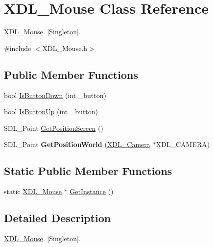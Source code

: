 \hypertarget{class_x_d_l___mouse}{\section{X\-D\-L\-\_\-\-Mouse Class Reference}
\label{class_x_d_l___mouse}
}


\hyperlink{class_x_d_l___mouse}{X\-D\-L\-\_\-\-Mouse}. \mbox{[}Singleton\mbox{]}.  




{\ttfamily \#include $<$X\-D\-L\-\_\-\-Mouse.\-h$>$}

\subsection*{Public Member Functions}
\begin{DoxyCompactItemize}
\item 
bool \hyperlink{class_x_d_l___mouse_ad07734a5e9bb2c0b32b991f9643c860e}{Is\-Button\-Down} (int \-\_\-button)
\item 
bool \hyperlink{class_x_d_l___mouse_af63c498b0d2b215842a7e333e87416e3}{Is\-Button\-Up} (int \-\_\-button)
\item 
S\-D\-L\-\_\-\-Point \hyperlink{class_x_d_l___mouse_a654ae153971ba2010b25a4fa430d1b16}{Get\-Position\-Screen} ()
\item 
\hypertarget{class_x_d_l___mouse_a9e68aafbf47ac4c3a52f09e83f65aa69}{S\-D\-L\-\_\-\-Point {\bfseries Get\-Position\-World} (\hyperlink{class_x_d_l___camera}{X\-D\-L\-\_\-\-Camera} $\ast$X\-D\-L\-\_\-\-C\-A\-M\-E\-R\-A)}\label{class_x_d_l___mouse_a9e68aafbf47ac4c3a52f09e83f65aa69}

\end{DoxyCompactItemize}
\subsection*{Static Public Member Functions}
\begin{DoxyCompactItemize}
\item 
static \hyperlink{class_x_d_l___mouse}{X\-D\-L\-\_\-\-Mouse} $\ast$ \hyperlink{class_x_d_l___mouse_a2074beb3e04a67b2a271f5c15f663a6d}{Get\-Instance} ()
\end{DoxyCompactItemize}


\subsection{Detailed Description}
\hyperlink{class_x_d_l___mouse}{X\-D\-L\-\_\-\-Mouse}. \mbox{[}Singleton\mbox{]}. 

